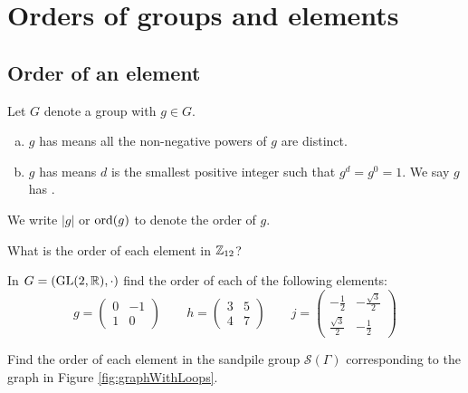 \documentclass[../algebraNotesMSRI-UP2016.tex]{subfiles}
\begin{document}
\section[\S \thesection]{Orders of groups and elements}
\subsection[\subsecname]{Order of an element}
\begin{frame}{\subsecname}
\begin{dfn}
Let $G$ denote a group with $g\in G$.
\begin{enumerate}[(a)]
\item $g$ has  means all the non-negative powers of $g$ are distinct.
\item $g$ has  means $d$ is the smallest positive integer such that $g^d=g^0=1$.  We say $g$ has .
\end{enumerate} 
We write $|g|$ or $\operatorname{ord}(g)$ to denote the order of $g$.
\end{dfn}

\smallGap
\begin{que}[cf. Problem 54]
What is the order of each element in $\mathbb Z_{12}$?
\end{que}
\end{frame}

\begin{frame}[c]
\begin{exe}[cf. Problem 53]\label{exe:prob53}
In $G=(\operatorname{GL}(2,\mathbb R),\cdot)$ find the order of each of the following elements:
\[
g=\begin{pmatrix}
	0 & -1 \\
	1 & 0 
	\end{pmatrix}
\qquad
h=\begin{pmatrix}
	3 & 5 \\
	4 & 7
	\end{pmatrix}
\qquad 
j=\begin{pmatrix}
	-\frac{1}{2} & -\frac{\sqrt 3}{2} \\
	\frac{\sqrt 3}{2} & -\frac{1}{2}
	\end{pmatrix}
\]
\end{exe}

\smallGap
\begin{exe}[cf. Problem 55]\label{exe:prob55}
Find the order of each element in the sandpile group $\mathscr S(\Gamma)$ corresponding to the graph in Figure \ref{fig:graphWithLoops}. 
\end{exe}
\end{frame}
\end{document}
